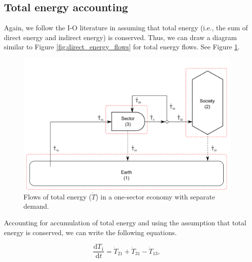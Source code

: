 \documentclass[authoryear,preprint,review,12pt]{elsarticle}
\begin{document}
%
%
%

\subsection{Total energy accounting}

Again, we follow the I-O literature in assuming that total energy (i.e., the sum of direct energy and indirect energy) is conserved. Thus, we can draw a diagram similar to Figure \ref{fig:direct_energy_flows} for total energy flows. See Figure \ref{fig:total_energy_flows_1S}.

\begin{figure}[h!]
\includegraphics[width=1.0\linewidth]{images/I-O_two_sector_total_energy.pdf}
\caption{Flows of total energy ($\dot{T}$) in a one-sector economy with separate demand.}
\label{fig:total_energy_flows_1S}
\end{figure}

Accounting for accumulation of total energy and using the assumption that total energy is conserved, we can write the following equations.

\begin{equation} \label{eq:CV_T_1}
	\frac{\mathrm{d}T_{1}}{\mathrm{d}t} 	 = \dot{T}_{21} + \dot{T}_{31} - \dot{T}_{13},
\end{equation}
\end{document}
